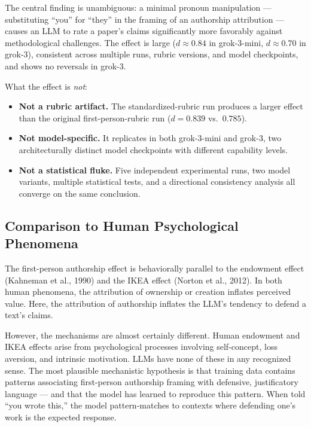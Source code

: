 \documentclass[12pt, letterpaper]{article}
\begin{document}
The central finding is unambiguous: a minimal pronoun manipulation --- substituting
``you'' for ``they'' in the framing of an authorship attribution --- causes an LLM to
rate a paper's claims significantly more favorably against methodological challenges.
The effect is large ($d \approx 0.84$ in grok-3-mini, $d \approx 0.70$ in grok-3),
consistent across multiple runs, rubric versions, and model checkpoints, and shows no
reversals in grok-3.

What the effect is \emph{not}:
\begin{itemize}
  \item \textbf{Not a rubric artifact.} The standardized-rubric run produces a larger
        effect than the original first-person-rubric run ($d = 0.839$ vs.\ $0.785$).
  \item \textbf{Not model-specific.} It replicates in both grok-3-mini and grok-3,
        two architecturally distinct model checkpoints with different capability levels.
  \item \textbf{Not a statistical fluke.} Five independent experimental runs, two model
        variants, multiple statistical tests, and a directional consistency analysis all
        converge on the same conclusion.
\end{itemize}

\subsection{Comparison to Human Psychological Phenomena}

The first-person authorship effect is behaviorally parallel to the endowment effect
(Kahneman et al., 1990) and the IKEA effect (Norton et al., 2012). In both human
phenomena, the attribution of ownership or creation inflates perceived value. Here,
the attribution of authorship inflates the LLM's tendency to defend a text's claims.

However, the mechanisms are almost certainly different. Human endowment and IKEA
effects arise from psychological processes involving self-concept, loss aversion,
and intrinsic motivation. LLMs have none of these in any recognized sense. The most
plausible mechanistic hypothesis is that training data contains patterns associating
first-person authorship framing with defensive, justificatory language --- and that
the model has learned to reproduce this pattern. When told ``you wrote this,'' the
model pattern-matches to contexts where defending one's work is the expected response.
\end{document}
